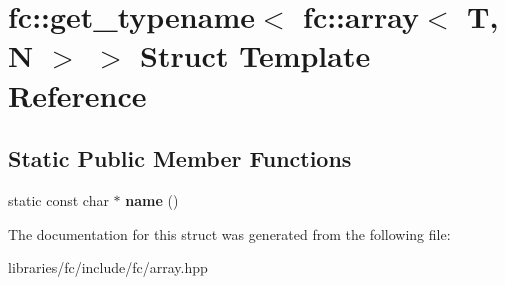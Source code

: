 \hypertarget{structfc_1_1get__typename_3_01fc_1_1array_3_01_t_00_01_n_01_4_01_4}{}\section{fc\+:\+:get\+\_\+typename$<$ fc\+:\+:array$<$ T, N $>$ $>$ Struct Template Reference}
\label{structfc_1_1get__typename_3_01fc_1_1array_3_01_t_00_01_n_01_4_01_4}
\subsection*{Static Public Member Functions}
\begin{DoxyCompactItemize}
\item 
\mbox{\label{structfc_1_1get__typename_3_01fc_1_1array_3_01_t_00_01_n_01_4_01_4_a112b5b7a2bf77de4084ddc2a2eee9514}} 
static const char $\ast$ {\bfseries name} ()
\end{DoxyCompactItemize}


The documentation for this struct was generated from the following file\+:\begin{DoxyCompactItemize}
\item 
libraries/fc/include/fc/array.\+hpp\end{DoxyCompactItemize}
